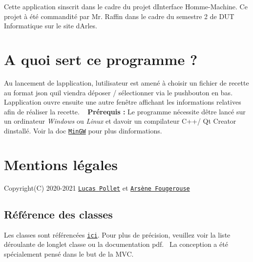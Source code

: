 Cette application s\textquotesingle{}inscrit dans le cadre du projet d\textquotesingle{}Interface Homme-\/\+Machine. Ce projet à été commandité par Mr. Raffin dans le cadre du semestre 2 de D\+UT Informatique sur le site d\textquotesingle{}Arles.\hypertarget{index_utilite}{}\section{A quoi sert ce programme ?}\label{index_utilite}
Au lancement de l\textquotesingle{}application, l\textquotesingle{}utilisateur est amené à choisir un fichier de recette au format json qu\textquotesingle{}il viendra déposer / sélectionner via le pushbouton en bas.~\newline
 L\textquotesingle{}application ouvre ensuite une autre fenêtre affichant les informations relatives afin de réaliser la recette. ~\newline
 {\bfseries Prérequis \+:} Le programme nécessite d\textquotesingle{}être lancé sur un ordinateur {\itshape Windows} ou {\itshape Linux} et d\textquotesingle{}avoir un compilateur C++/ Qt Creator d\textquotesingle{}installé. Voir la doc \href{http://www.mingw.org}{\tt Min\+GW} pour plus d\textquotesingle{}informations.\hypertarget{index_mentions}{}\section{Mentions légales}\label{index_mentions}
Copyright(\+C) 2020-\/2021 \href{ mailto: lucas.pollet@etu.univ-amu.fr}{\tt Lucas Pollet} et \href{ mailto: arsene.fougerouse@etu.univ-amu.fr}{\tt Arsène Fougerouse}\hypertarget{index_references}{}\subsection{Référence des classes}\label{index_references}
Les classes sont référencées \href{file:///home/gridexx/projet-recette-json/doc/html/annotated.html}{\tt ici}. Pour plus de précision, veuillez voir la liste déroulante de l\textquotesingle{}onglet classe ou la documentation pdf.~\newline
 La conception a été spécialement pensé dans le but de la M\+VC. 